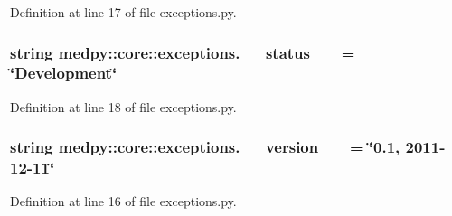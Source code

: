 Definition at line 17 of file exceptions.py.

\hypertarget{namespacemedpy_1_1core_1_1exceptions_a6d24d4a0cf677ec046471cd2aafe73fd}{
\subsubsection[{\_\-\_\-status\_\-\_\-}]{\setlength{\rightskip}{0pt plus 5cm}string {\bf medpy::core::exceptions.\_\-\_\-status\_\-\_\-} = \char`\"{}Development\char`\"{}}}
\label{namespacemedpy_1_1core_1_1exceptions_a6d24d4a0cf677ec046471cd2aafe73fd}


Definition at line 18 of file exceptions.py.

\hypertarget{namespacemedpy_1_1core_1_1exceptions_a2bd51ce1d4911fc0dbe5506aabc2af2d}{
\subsubsection[{\_\-\_\-version\_\-\_\-}]{\setlength{\rightskip}{0pt plus 5cm}string {\bf medpy::core::exceptions.\_\-\_\-version\_\-\_\-} = \char`\"{}0.1, 2011-\/12-\/11\char`\"{}}}
\label{namespacemedpy_1_1core_1_1exceptions_a2bd51ce1d4911fc0dbe5506aabc2af2d}


Definition at line 16 of file exceptions.py.

